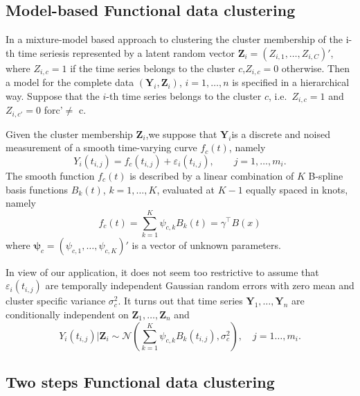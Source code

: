 \documentclass[]{article}
\begin{document}
\subsection{Model-based Functional data clustering}

In a mixture-model based approach to clustering the cluster membership
of the i-th time seriesis represented by a latent random vector
\(\mathbf{Z}_i=(Z_{i,1},\ldots,Z_{i,C})'\), where \(Z_{i,c}=1\) if the
time series belongs to the cluster \(c\),\(Z_{i,c}=0\) otherwise. Then a
model for the complete data \((\mathbf{Y}_i,\mathbf{Z}_i)\),
\(i=1,\ldots,n\) is specified in a hierarchical way. Suppose that the
\(i\)-th time series belongs to the cluster \(c\), i.e.~\(Z_{i,c}=1\)
and \(Z_{i,c'}=0\) forc'\(\ne\) c.

Given the cluster membership \(\mathbf{Z}_i\),we suppose that
\(\mathbf{Y}_i\)is a discrete and noised measurement of a smooth
time-varying curve \(f_{c}(t)\), namely \[
Y_i(t_{i,j})=f_c(t_{i,j})+\varepsilon_{i}(t_{i,j}),\qquad j=1,\ldots,m_i.
\] The smooth function \(f_c(t)\) is described by a linear combination
of \(K\) B-spline basis functions \(B_k(t)\), \(k=1,\ldots,K\),
evaluated at \(K-1\) equally spaced in knots, namely \[
f_c(t)=\sum_{k=1}^K \psi_{c,k} B_k(t)
=\gamma^\top B(x)
\] where \(\boldsymbol{\psi}_{c}=(\psi_{c,1},\ldots, \psi_{c,K})'\) is a
vector of unknown parameters.

In view of our application, it does not seem too restrictive to assume
that \(\varepsilon_i(t_{i,j})\) are temporally independent Gaussian
random errors with zero mean and cluster specific variance
\(\sigma_c^2\). It turns out that time series
\(\mathbf{Y}_1,\ldots,\mathbf{Y}_n\) are conditionally independent on
\(\mathbf{Z}_1,\ldots,\mathbf{Z}_n\) and \begin{equation}\label{eq:mod}
Y_i(t_{i,j})|\mathbf{Z}_{i} \sim \mathcal{N}\left(\sum_{k=1}^K \psi_{c,k} B_k(t_{i,j}),\sigma^2_c\right), \quad j=1\ldots,m_i.
 \end{equation}

\subsection{Two steps Functional data clustering}
\end{document}
